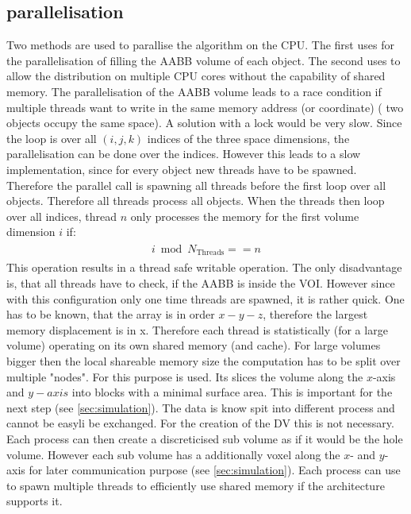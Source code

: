 \subsection{parallelisation}
% 
Two methods are used to parallise the algorithm on the \ac{CPU}.
The first uses \openmp for the parallelisation of filling the \ac{AABB} volume of each object.
The second uses \mpi to allow the distribution on multiple \ac{CPU} cores without the capability of shared memory. 
% 
The parallelisation of the \ac{AABB} volume leads to a race condition if multiple threads want to write in the same memory address (or coordinate) (\eg{} two objects occupy the same space).
A solution with a lock would be very slow.
Since the loop is over all $(i,j,k)$ indices of the three space dimensions, the parallelisation can be done over the indices.
However this leads to a slow implementation, since for every object new threads have to be spawned.
Therefore the parallel call is spawning all threads before the first loop over all objects.
Therefore all threads process all objects.
When the threads then loop over all indices, thread $n$ only processes the memory for the first volume dimension $i$ if:
% 
\begin{align}
\begin{split}
    i \bmod N_{\text{Threads}} == n
\end{split}
\end{align}
% 
This operation results in a thread safe writable operation.
The only disadvantage is, that all threads have to check, if the \ac{AABB} is inside the \ac{VOI}.
However since with this configuration only one time threads are spawned, it is rather quick.
One has to be known, that the array is in order $x-y-z$, therefore the largest memory displacement is in x.
Therefore each thread is statistically (for a large volume) operating on its own shared memory (and cache).
% 
For large volumes bigger then the local shareable memory size the computation has to be split over multiple "nodes".
For this purpose \mpi is used.
Its slices the volume along the $x$-axis and $y-axis$ into blocks with a minimal surface area.
This is important for the next step (see \cref{sec:simulation}).
The data is know spit into different process and cannot be easyli be exchanged.
For the creation of the DV this is not necessary.
Each \mpi process can then create a discreticised sub volume as if it would be the hole volume.
However each sub volume has a additionally voxel along the $x$- and $y$-axis for later communication purpose (see \cref{sec:simulation}).
Each \mpi process can use \openmp to spawn multiple threads to efficiently use shared memory if the architecture supports it.
% 
% 
% 
